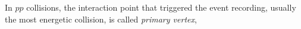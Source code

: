 

In $pp$ collisions, the interaction point that triggered the event recording,
usually the most energetic collision, is called \emph{primary vertex},
